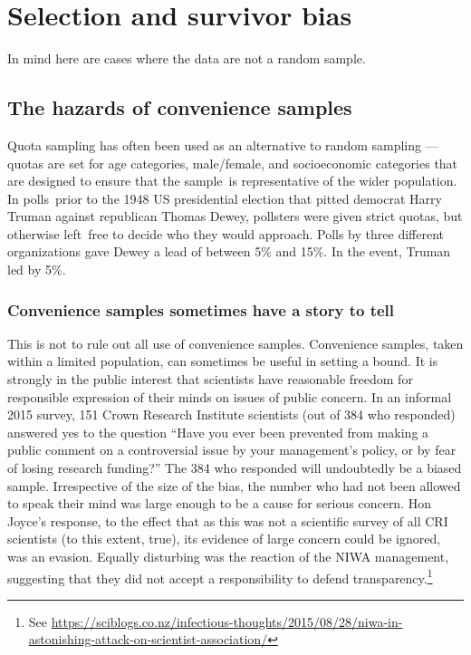 \documentclass[
  10pt,
  b5paper]{book}
\begin{document}
\hypertarget{selection-and-survivor-bias}{%
\chapter{Selection and survivor bias}\label{selection-and-survivor-bias}}

In mind here are cases where the data are not a random sample.

\hypertarget{the-hazards-of-convenience-samples}{%
\section{The hazards of convenience samples}\label{the-hazards-of-convenience-samples}}

Quota sampling has often been used as an alternative to random
sampling --- quotas are set for age categories, male/female,
and socioeconomic categories that are designed to ensure that
the sample~is representative of the wider population.
In polls~prior to the 1948 US presidential election that pitted
democrat Harry Truman against republican Thomas Dewey,
pollsters were given strict quotas, but otherwise left~free to
decide who they would approach. Polls by three different
organizations gave Dewey a lead of between 5\% and 15\%. In the
event, Truman led by 5\%.

\hypertarget{convenience-samples-sometimes-have-a-story-to-tell}{%
\subsection*{Convenience samples sometimes have a story to tell}\label{convenience-samples-sometimes-have-a-story-to-tell}}

This is not to rule out all use of convenience samples.
Convenience samples, taken within a limited population,
can sometimes be useful in setting a bound.
It is strongly in the public interest that scientists have
reasonable freedom for responsible expression of their minds
on issues of public concern. In an informal 2015 survey, 151
Crown Research Institute scientists (out of 384 who responded)
answered yes to the question ``Have you ever been prevented
from making a public comment on a controversial issue by your
management's policy, or by fear of losing research funding?''
The 384 who responded will undoubtedly be a biased sample.
Irrespective of the size of the bias, the number who had not
been allowed to speak their mind was large enough to be a cause
for serious concern. Hon Joyce's response, to the effect that
as this was not a scientific survey of all CRI scientists
(to this extent, true), its evidence of large concern could be
ignored, was an evasion. Equally disturbing was the reaction
of the NIWA management, suggesting that they did not accept a
responsibility to defend transparency.\footnote{See \url{https://sciblogs.co.nz/infectious-thoughts/2015/08/28/niwa-in-astonishing-attack-on-scientist-association/}}
\end{document}
